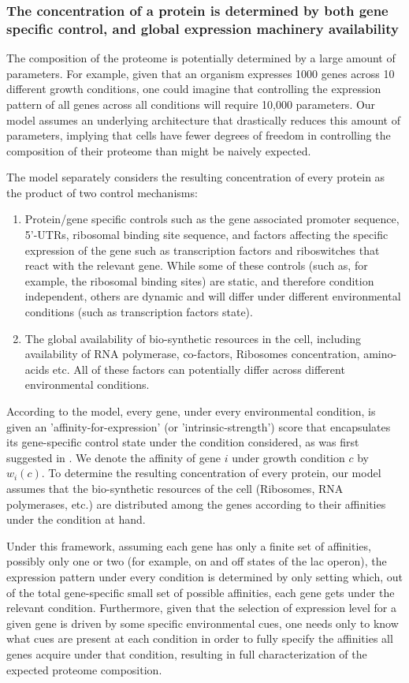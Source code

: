 \subsubsection{The concentration of a protein is determined by both gene specific control, and global
expression machinery availability}
The composition of the proteome is potentially determined by a large amount of parameters.
For example, given that an organism expresses 1000 genes across 10 different growth conditions, one could imagine that controlling the expression pattern of all genes across all conditions will require 10,000 parameters.
Our model assumes an underlying architecture that drastically reduces this amount of parameters, implying that cells have fewer degrees of freedom in controlling the composition of their proteome than might be naively expected.

The model separately considers the resulting concentration of every protein as the product of two control mechanisms:
\begin{enumerate}
\item Protein/gene specific controls such as the gene associated promoter sequence, 5'-UTRs, ribosomal binding site sequence, and factors affecting the specific expression of the gene such as transcription factors and riboswitches that react with the relevant gene.
  While some of these controls (such as, for example, the ribosomal binding sites) are static, and therefore condition independent, others are dynamic and will differ under different environmental conditions (such as transcription factors state).
\item The global availability of bio-synthetic resources in the cell, including availability of RNA polymerase, co-factors, Ribosomes concentration, amino-acids etc.
  All of these factors can potentially differ across different environmental conditions.
\end{enumerate}


According to the model, every gene, under every environmental condition, is given an 'affinity-for-expression' (or 'intrinsic-strength') score that encapsulates its gene-specific control state under the condition considered, as was first suggested in \cite{Maaloe1969}.
We denote the affinity of gene $i$ under growth condition $c$ by $w_i(c)$.
To determine the resulting concentration of every protein, our model assumes that the bio-synthetic resources of the cell (Ribosomes, RNA polymerases, etc.) are distributed among the genes according to their affinities under the condition at hand.

Under this framework, assuming each gene has only a finite set of affinities, possibly only one or two (for example, on and off states of the lac operon), the expression pattern under every condition is determined by only setting which, out of the total gene-specific small set of possible affinities, each gene gets under the relevant condition.
Furthermore, given that the selection of expression level for a given gene is driven by some specific environmental cues, one needs only to know what cues are present at each condition in order to fully specify the affinities all genes acquire under that condition, resulting in full characterization of the expected proteome composition.
